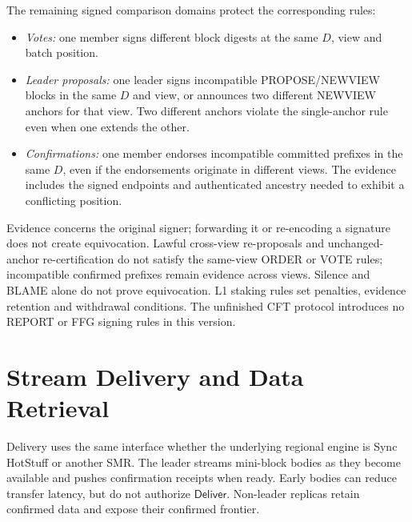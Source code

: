 \documentclass[11pt,a4paper,onecolumn]{article}
\newcommand{\Tag}[1]{\ensuremath{\mathsf{#1}}}
\newcounter{protocol}
\begin{document}
The remaining signed comparison domains protect the corresponding rules:
\begin{itemize}
\item \emph{Votes:} one member signs different block digests at the same
$D$, view and batch position.
\item \emph{Leader proposals:} one leader signs incompatible
PROPOSE/NEWVIEW blocks in the same $D$ and view, or announces two different
NEWVIEW anchors for that view. Two different anchors violate the single-anchor
rule even when one extends the other.
\item \emph{Confirmations:} one member endorses incompatible committed
prefixes in the same $D$, even if the endorsements originate in different
views. The evidence includes the signed endpoints and authenticated ancestry
needed to exhibit a conflicting position.
\end{itemize}
Evidence concerns the original signer; forwarding it or re-encoding a
signature does not create equivocation. Lawful cross-view re-proposals and
unchanged-anchor re-certification do not satisfy the same-view ORDER or VOTE
rules; incompatible confirmed prefixes remain evidence across views.
Silence and BLAME alone do not prove equivocation. L1 staking rules set
penalties, evidence retention and withdrawal conditions.
The unfinished CFT protocol introduces
no REPORT or FFG signing rules in this version.

\section{Stream Delivery and Data Retrieval}\label{sec:delivery}
Delivery uses the same interface whether the underlying regional engine is
Sync HotStuff or another SMR. The leader streams mini-block bodies as they
become available and pushes confirmation receipts when ready. Early bodies
can reduce transfer latency, but do not authorize \Tag{Deliver}.
Non-leader replicas retain confirmed data and expose their confirmed frontier.
\end{document}

